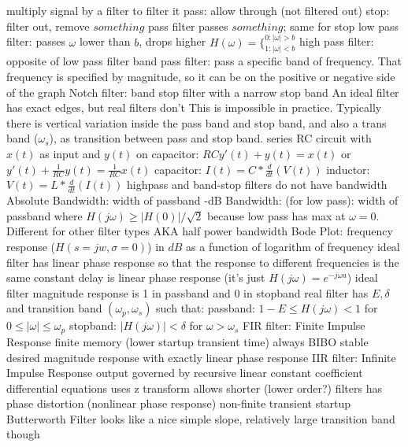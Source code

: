 \documentclass[12pt]{article}
\begin{document}
\begin{multicols*}{2}
\begin{flushleft}
\begin{outline}[longenum]
  \1 multiply signal by a filter to filter it
  \1 pass: allow through (not filtered out)
  \1 stop: filter out, remove
  \1 $something$ pass filter passes $something$; same for stop
  \1 low pass filter: passes $\omega$ lower than $b$, drops higher
    $H(\omega)=\{ _{1:|\omega|<b}^{0:|\omega|>b}$
  \1 high pass filter: opposite of low pass filter
  \1 band pass filter: pass a specific band of frequency.
    \2 That frequency is specified by magnitude, so it can be on the positive or negative side of the graph
  \1 Notch filter: band stop filter with a narrow stop band
  \1 An ideal filter has exact edges, but real filters don't
    \2 This is impossible in practice. 
      Typically there is vertical variation inside the pass band and stop band, and also a trans band ($\omega_s$), as transition between pass and stop band.
  \1 series RC circuit with $x(t)$ as input and $y(t)$ on capacitor: 
    $RC y'(t) + y(t) = x(t)$
    or $y'(t) + \frac{1}{RC}y(t) = \frac{1}{RC}x(t)$
    \2 capacitor: $I(t) = C*\frac{d}{dt}(V(t))$
    \2 inductor: $V(t) = L*\frac{d}{dt}(I(t))$
  \1 highpass and band-stop filters do not have bandwidth
  \1 Absolute Bandwidth: width of passband
  -dB Bandwidth: (for low pass): width of passband where $H(j\omega) \geq |H(0)|/\sqrt{2}$
    \2 because low pass has max at $\omega=0$. Different for other filter types
    \2 AKA half power bandwidth
  \1 Bode Plot: frequency response ($H(s=jw, \sigma=0)$) in $dB$ as a function of logarithm of frequency
  \1 ideal filter has linear phase response
    \2 so that the response to different frequencies is the same
    \2 constant delay is linear phase response (it's just $H(j\omega)=e^{-j\omega a}$)
  \1 ideal filter magnitude response is 1 in passband and 0 in stopband
  \1 real filter has $E, \delta$ and transition band $(\omega_p, \omega_s)$ such that:
    \2 passband: $1 - E \leq H(j\omega) < 1$ for $0\leq |\omega| \leq \omega_p$
    \2 stopband: $|H(j\omega)| < \delta$ for $\omega > \omega_s$
  \1 FIR filter: Finite Impulse Response
    \2 finite memory (lower startup transient time)
    \2 always BIBO stable
    \2 desired magnitude response with exactly linear phase response
  \1 IIR filter: Infinite Impulse Response
    \2 output governed by recursive linear constant coefficient differential equations
    \2 uses z transform
    \2 allows shorter (lower order?) filters
    \2 has phase distortion (nonlinear phase response)
    \2 non-finite transient startup
  \1 Butterworth Filter
    \2 looks like a nice simple slope, relatively large transition band though

\end{outline}
\end{flushleft}
\end{multicols*}
\end{document}
